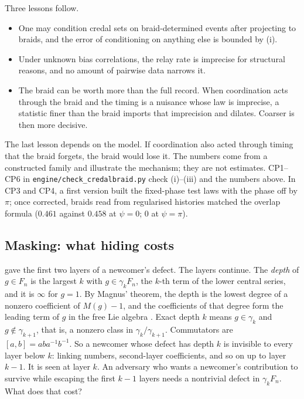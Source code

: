 \documentclass[11pt]{article}
\theoremstyle{definition}\newtheorem{definition}[theorem]{Definition}\newtheorem{remark}[theorem]{Remark}\newtheorem{example}[theorem]{Example}\newtheorem{problem}[theorem]{Open problem}\crefname{problem}{Problem}{Problems}
\begin{document}
Three lessons follow.
\begin{itemize}
\item One may condition credal sets on braid-determined events after projecting to braids, and the error of conditioning on anything else is bounded by (i).
\item Under unknown bias correlations, the relay rate is imprecise for structural reasons, and no amount of pairwise data narrows it.
\item The braid can be worth more than the full record. When coordination acts through the braid and the timing is a nuisance whose law is imprecise, a statistic finer than the braid imports that imprecision and dilates. Coarser is then more decisive.
\end{itemize}
The last lesson depends on the model. If coordination also acted through timing that the braid forgets, the braid would lose it. The numbers come from a constructed family and illustrate the mechanism; they are not estimates. CP1--CP6 in \texttt{engine/check\_credalbraid.py} check (i)--(iii) and the numbers above. In CP3 and CP4, a first version built the fixed-phase test laws with the phase off by $\pi$; once corrected, braids read from regularised histories matched the overlap formula ($0.461$ against $0.458$ at $\psi=0$; $0$ at $\psi=\pi$).

\subsection{Masking: what hiding costs}\label{sec:masking}
 gave the first two layers of a newcomer's defect. The layers continue. The \emph{depth} of $g\in F_n$ is the largest $k$ with $g\in\gamma_kF_n$, the $k$-th term of the lower central series, and it is $\infty$ for $g=1$. By Magnus' theorem, the depth is the lowest degree of a nonzero coefficient of $M(g)-1$, and the coefficients of that degree form the leading term of $g$ in the free Lie algebra \cite{MagnusKarrassSolitar1966}. Exact depth $k$ means $g\in\gamma_k$ and $g\notin\gamma_{k+1}$, that is, a nonzero class in $\gamma_k/\gamma_{k+1}$. Commutators are $[a,b]=aba^{-1}b^{-1}$. So a newcomer whose defect has depth $k$ is invisible to every layer below $k$: linking numbers, second-layer coefficients, and so on up to layer $k-1$. It is seen at layer $k$. An adversary who wants a newcomer's contribution to survive while escaping the first $k-1$ layers needs a nontrivial defect in $\gamma_kF_n$. What does that cost?
\end{document}
